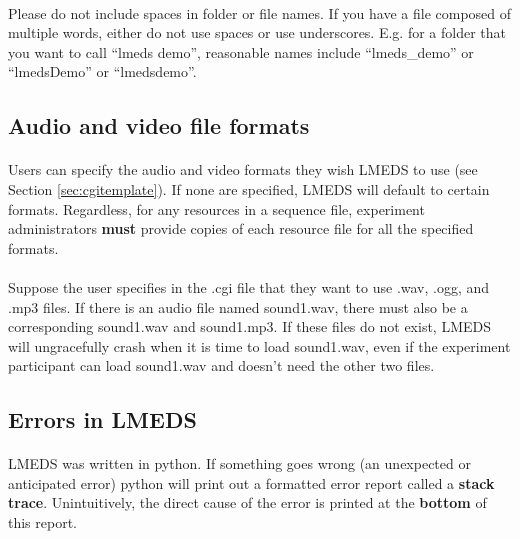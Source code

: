 \begin{tcolorbox}[breakable,colback=white,colframe=red,width=\dimexpr\textwidth+12mm\relax,enlarge left by=-6mm]
\paragraph{}

Please do not include spaces in folder or file names.  If you have a file composed of multiple words, either do not use spaces or use underscores.  E.g. for a folder that you want to call ``lmeds demo'', reasonable names include ``lmeds\_demo'' or ``lmedsDemo'' or ``lmedsdemo''.

\subsection{Audio and video file formats}

\paragraph{}

Users can specify the audio and video formats they wish LMEDS to use (see Section \ref{sec:cgitemplate}).  If none are specified, LMEDS will default to certain formats.  Regardless, for any resources in a sequence file, experiment administrators \textbf{must} provide copies of each resource file for all the specified formats.  

\paragraph{}

Suppose the user specifies in the .cgi file that they want to use .wav, .ogg, and .mp3 files.  If there is an audio file named sound1.wav, there must also be a corresponding sound1.wav and sound1.mp3.  If these files do not exist, LMEDS will ungracefully crash when it is time to load sound1.wav, even if the experiment participant can load sound1.wav and doesn't need the other two files.



\subsection{Errors in LMEDS}

\paragraph{}

LMEDS was written in python.  If something goes wrong (an unexpected or anticipated error) python will print out a formatted error report called a \textbf{stack trace}.  Unintuitively, the direct cause of the error is printed at the \textbf{bottom} of this report.  


\end{tcolorbox}
